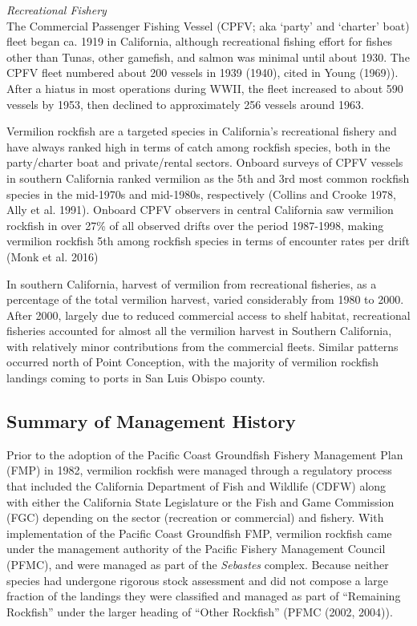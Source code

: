 \documentclass[
  english,
  a4paper,
]{article}
\begin{document}
\emph{Recreational Fishery}\\
The Commercial Passenger Fishing Vessel (CPFV; aka `party' and `charter' boat)
fleet began ca. 1919 in California, although recreational fishing effort for
fishes other than Tunas, other gamefish, and salmon was minimal until about 1930. The CPFV fleet numbered about 200 vessels in 1939 (1940), cited in Young (1969)).
After a hiatus in most operations during WWII, the fleet increased to about 590 vessels
by 1953, then declined to approximately 256 vessels around 1963.

Vermilion rockfish are a targeted species in California's recreational fishery
and have always ranked high in terms of catch among rockfish species, both in the party/charter
boat and private/rental sectors. Onboard surveys of CPFV vessels in southern California ranked vermilion as the 5th and 3rd most common rockfish species in the mid-1970s and mid-1980s, respectively (Collins and Crooke 1978, Ally et al. 1991). Onboard CPFV observers in central California saw vermilion rockfish in over 27\% of all observed drifts over the period 1987-1998, making vermilion rockfish 5th among rockfish species in terms of encounter rates per drift (Monk et al. 2016)

In southern California, harvest of vermilion from recreational fisheries, as a percentage of the total vermilion harvest, varied considerably from 1980 to 2000. After 2000, largely due to reduced commercial access to shelf habitat, recreational fisheries accounted for almost all the vermilion harvest in Southern California, with relatively minor contributions from the commercial fleets. Similar patterns occurred north of Point Conception, with the majority of vermilion rockfish landings coming to ports in San Luis Obispo county.

\hypertarget{summary-of-management-history}{%
\subsection{Summary of Management History}\label{summary-of-management-history}}

Prior to the adoption of the Pacific Coast Groundfish Fishery Management Plan (FMP)
in 1982, vermilion rockfish were managed through a regulatory process that included the
California Department of Fish and Wildlife (CDFW) along
with either the California State Legislature or the Fish and Game Commission (FGC)
depending on the sector (recreation or commercial) and fishery. With implementation
of the Pacific Coast Groundfish FMP, vermilion rockfish came under the management
authority of the Pacific Fishery Management Council (PFMC), and were managed as part
of the \emph{Sebastes} complex. Because neither species had undergone rigorous stock assessment
and did not compose a large fraction of the landings they were classified and
managed as part of ``Remaining Rockfish'' under the larger
heading of ``Other Rockfish'' (PFMC (2002, 2004)).
\end{document}
